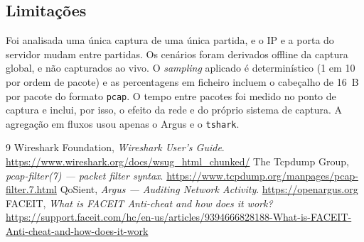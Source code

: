 \documentclass[11pt,a4paper]{article}
\begin{document}
\subsection{Limitações}
Foi analisada uma única captura de uma única partida, e o IP e a porta do servidor mudam entre partidas. Os cenários foram
derivados offline da captura global, e não capturados ao vivo. O \emph{sampling} aplicado é determinístico (1 em 10 por ordem de
pacote) e as percentagens em ficheiro incluem o cabeçalho de 16~B por pacote do formato \texttt{pcap}. O tempo entre pacotes
foi medido no ponto de captura e inclui, por isso, o efeito da rede e do próprio sistema de captura. A agregação em fluxos
usou apenas o Argus e o \texttt{tshark}.

{\small
\begin{thebibliography}{9}
 Wireshark Foundation, \emph{Wireshark User's Guide}. \url{https://www.wireshark.org/docs/wsug_html_chunked/}
 The Tcpdump Group, \emph{pcap-filter(7) --- packet filter syntax}. \url{https://www.tcpdump.org/manpages/pcap-filter.7.html}
 QoSient, \emph{Argus --- Auditing Network Activity}. \url{https://openargus.org}
 FACEIT, \emph{What is FACEIT Anti-cheat and how does it work?}
\url{https://support.faceit.com/hc/en-us/articles/9394666828188-What-is-FACEIT-Anti-cheat-and-how-does-it-work}
\end{thebibliography}
}

\appendix
\lstset{basicstyle=\ttfamily\scriptsize}
\end{document}
